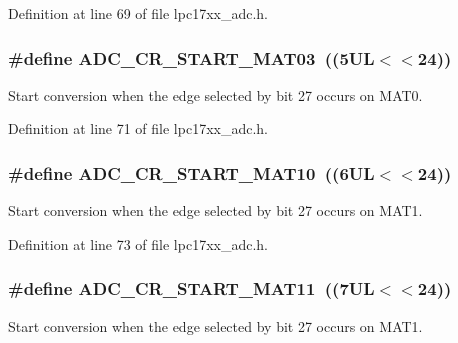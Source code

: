 \-Definition at line 69 of file lpc17xx\-\_\-adc.\-h.

\hypertarget{group___a_d_c___private___macros_ga61d62f698ffa3c9772e1bea985f47e62}{
\subsubsection[{\-A\-D\-C\-\_\-\-C\-R\-\_\-\-S\-T\-A\-R\-T\-\_\-\-M\-A\-T03}]{\setlength{\rightskip}{0pt plus 5cm}\#define {\bf \-A\-D\-C\-\_\-\-C\-R\-\_\-\-S\-T\-A\-R\-T\-\_\-\-M\-A\-T03}~((5\-U\-L$<$$<$24))}}\label{group___a_d_c___private___macros_ga61d62f698ffa3c9772e1bea985f47e62}
\-Start conversion when the edge selected by bit 27 occurs on \-M\-A\-T0. 

\-Definition at line 71 of file lpc17xx\-\_\-adc.\-h.

\hypertarget{group___a_d_c___private___macros_ga1a95007f7fa04b41528857b1f8e065da}{
\subsubsection[{\-A\-D\-C\-\_\-\-C\-R\-\_\-\-S\-T\-A\-R\-T\-\_\-\-M\-A\-T10}]{\setlength{\rightskip}{0pt plus 5cm}\#define {\bf \-A\-D\-C\-\_\-\-C\-R\-\_\-\-S\-T\-A\-R\-T\-\_\-\-M\-A\-T10}~((6\-U\-L$<$$<$24))}}\label{group___a_d_c___private___macros_ga1a95007f7fa04b41528857b1f8e065da}
\-Start conversion when the edge selected by bit 27 occurs on \-M\-A\-T1. 

\-Definition at line 73 of file lpc17xx\-\_\-adc.\-h.

\hypertarget{group___a_d_c___private___macros_gac4a508f05c04a51d3af94ab0f1686716}{
\subsubsection[{\-A\-D\-C\-\_\-\-C\-R\-\_\-\-S\-T\-A\-R\-T\-\_\-\-M\-A\-T11}]{\setlength{\rightskip}{0pt plus 5cm}\#define {\bf \-A\-D\-C\-\_\-\-C\-R\-\_\-\-S\-T\-A\-R\-T\-\_\-\-M\-A\-T11}~((7\-U\-L$<$$<$24))}}\label{group___a_d_c___private___macros_gac4a508f05c04a51d3af94ab0f1686716}
\-Start conversion when the edge selected by bit 27 occurs on \-M\-A\-T1. 

